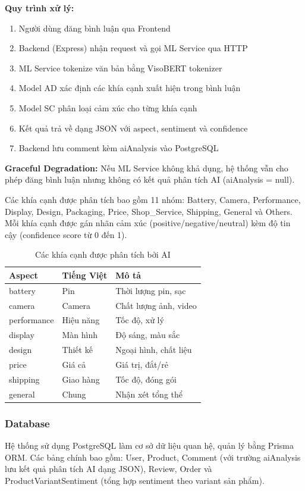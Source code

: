 \textbf{Quy trình xử lý:}
\begin{enumerate}
    \item Người dùng đăng bình luận qua Frontend
    \item Backend (Express) nhận request và gọi ML Service qua HTTP
    \item ML Service tokenize văn bản bằng VisoBERT tokenizer
    \item Model AD xác định các khía cạnh xuất hiện trong bình luận
    \item Model SC phân loại cảm xúc cho từng khía cạnh
    \item Kết quả trả về dạng JSON với aspect, sentiment và confidence
    \item Backend lưu comment kèm aiAnalysis vào PostgreSQL
\end{enumerate}

\textbf{Graceful Degradation:} Nếu ML Service không khả dụng, hệ thống vẫn cho phép đăng bình luận nhưng không có kết quả phân tích AI (aiAnalysis = null).

Các khía cạnh được phân tích bao gồm 11 nhóm: Battery, Camera, Performance, Display, Design, Packaging, Price, Shop\_Service, Shipping, General và Others. Mỗi khía cạnh được gán nhãn cảm xúc (positive/negative/neutral) kèm độ tin cậy (confidence score từ 0 đến 1).

\begin{table}[H]
\centering
\begin{tabular}{|l|l|l|}
\hline
\textbf{Aspect} & \textbf{Tiếng Việt} & \textbf{Mô tả} \\
\hline
battery & Pin & Thời lượng pin, sạc \\
\hline
camera & Camera & Chất lượng ảnh, video \\
\hline
performance & Hiệu năng & Tốc độ, xử lý \\
\hline
display & Màn hình & Độ sáng, màu sắc \\
\hline
design & Thiết kế & Ngoại hình, chất liệu \\
\hline
price & Giá cả & Giá trị, đắt/rẻ \\
\hline
shipping & Giao hàng & Tốc độ, đóng gói \\
\hline
general & Chung & Nhận xét tổng thể \\
\hline
\end{tabular}
\caption{Các khía cạnh được phân tích bởi AI}
\label{tab:ai-aspects}
\end{table}

\subsubsection{Database}
Hệ thống sử dụng PostgreSQL làm cơ sở dữ liệu quan hệ, quản lý bằng Prisma ORM. Các bảng chính bao gồm: User, Product, Comment (với trường aiAnalysis lưu kết quả phân tích AI dạng JSON), Review, Order và ProductVariantSentiment (tổng hợp sentiment theo variant sản phẩm).